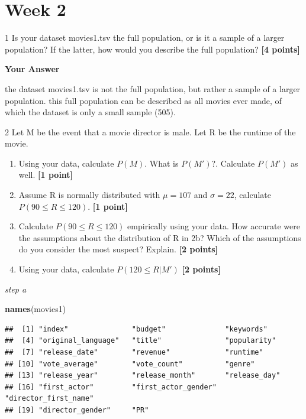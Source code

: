 \documentclass[
]{article}
\newenvironment{Shaded}{\begin{snugshade}}{\end{snugshade}}
\newcommand{\FunctionTok}[1]{\textcolor[rgb]{0.13,0.29,0.53}{\textbf{#1}}}
\newcommand{\NormalTok}[1]{#1}
\providecommand{\tightlist}{%
  \setlength{\itemsep}{0pt}\setlength{\parskip}{0pt}}
\begin{document}
\section{Week 2}\label{week-2}

1 Is your dataset movies1.tsv the full population, or is it a sample of
a larger population? If the latter, how would you describe the full
population? \textbf{[4 points]}

\textbf{Your Answer}

the dataset movies1.tsv is not the full population, but rather a sample
of a larger population. this full population can be described as all
movies ever made, of which the dataset is only a small sample (505).

2 Let M be the event that a movie director is male. Let R be the runtime
of the movie.

\begin{enumerate}
\def\labelenumi{\alph{enumi}.}
\tightlist
\item
  Using your data, calculate \(P(M)\). What is \(P(M')\)?. Calculate
  \(P(M')\) as well. \textbf{[1 point]}
\item
  Assume R is normally distributed with \(\mu=107\) and \(\sigma=22\),
  calculate \(P(90 \leq R \leq 120)\). \textbf{[1 point]}
\item
  Calculate \(P(90 \leq R \leq 120)\) empirically using your data. How
  accurate were the assumptions about the distribution of R in 2b? Which
  of the assumptions do you consider the most suspect? Explain.
  \textbf{[2 points]}
\item
  Using your data, calculate \(P(120 \leq R | M')\) \textbf{[2 points]}
\end{enumerate}

\emph{step a}

\begin{Shaded}
\begin{Highlighting}[]
\FunctionTok{names}\NormalTok{(movies1)}
\end{Highlighting}
\end{Shaded}

\begin{verbatim}
##  [1] "index"               "budget"              "keywords"           
##  [4] "original_language"   "title"               "popularity"         
##  [7] "release_date"        "revenue"             "runtime"            
## [10] "vote_average"        "vote_count"          "genre"              
## [13] "release_year"        "release_month"       "release_day"        
## [16] "first_actor"         "first_actor_gender"  "director_first_name"
## [19] "director_gender"     "PR"
\end{verbatim}
\end{document}
